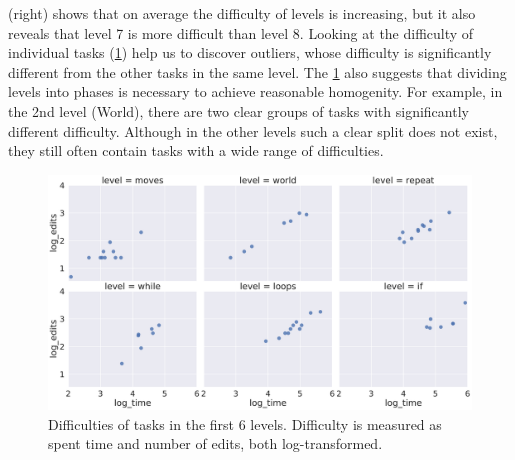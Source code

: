  (right) shows that on average the difficulty of levels
is increasing, but it also reveals that level 7 is more difficult than level 8.
Looking at the difficulty of individual tasks (\cref{fig:difficulties-tasks-levels})
help us to discover outliers, whose difficulty is significantly
different from the other tasks in the same level.
The \cref{fig:difficulties-tasks-levels} also suggests that dividing levels
into phases is necessary to achieve reasonable homogenity. For example, in the 2nd
level (World), there are two clear groups of tasks with significantly different
difficulty. Although in the other levels such a clear split does not exist,
they still often contain tasks with a wide range of difficulties.

\begin{figure}[htb]
\centering
\includegraphics[width=\textwidth]{img/difficulties-tasks-levels}
\caption{%
  Difficulties of tasks in the first 6 levels.
  Difficulty is measured as spent time and number of edits, both log-transformed.}
\label{fig:difficulties-tasks-levels}
\end{figure}

